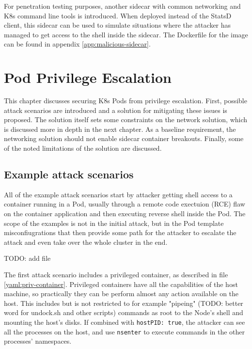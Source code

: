\documentclass[english, 12pt, a4paper, sci, utf8, a-2b, online]{aaltothesis}
\begin{document}
For penetration testing purposes, another sidecar with common networking and K8s command line tools is introduced. When deployed instead of the StatsD client, this sidecar can be used to simulate situations where the attacker has managed to get access to the shell inside the sidecar. The Dockerfile for the image can be found in appendix \ref{app:malicious-sidecar}.

\clearpage

\section{Pod Privilege Escalation} \label{sec:pod-hardening}

This chapter discusses securing K8s Pods from privilege escalation. First, possible attack scenarios are introduced and a solution for mitigating these issues is proposed. The solution itself sets some constraints on the network solution, which is discussed more in depth in the next chapter. As a baseline requirement, the networking solution should not enable sidecar container breakouts. Finally, some of the noted limitations of the solution are discussed.

\subsection{Example attack scenarios}

All of the example attack scenarios start by attacker getting shell access to a container running in a Pod, usually through a remote code exectuion (RCE) flaw on the container application and then executing reverse shell inside the Pod. The scope of the examples is not in the initial attack, but in the Pod template misconfiugrations that then provide some path for the attacker to escalate the attack and even take over the whole cluster in the end.

TODO: add file \label{yaml:priv-container}

The first attack scenario includes a privileged container, as described in file \ref{yaml:priv-container}. Privileged containers have all the capabilities of the host machine, so practically they can be perform almost any action available on the host. This includes but is not restricted to for example "pipeing" (TODO: better word for undock.sh and other scripts) commands as root to the Node's shell and mounting the host's disks. If combined with \texttt{hostPID:\ true}, the attacker can see all the processes on the host, and use \texttt{nsenter} to execute commands in the other processes' namespaces.
\end{document}
